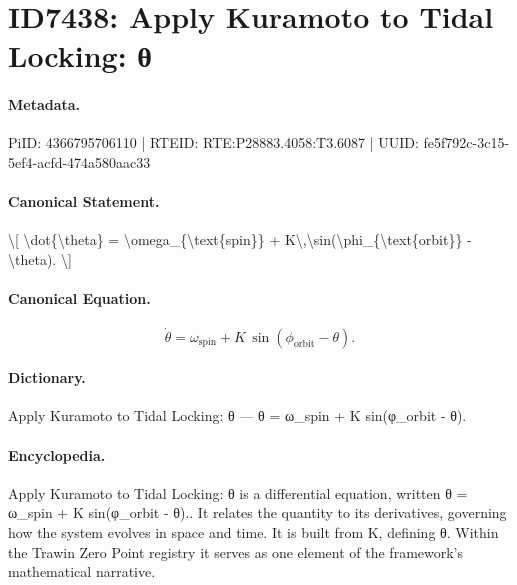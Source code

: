 \section*{ID7438: Apply Kuramoto to Tidal Locking: θ}
\paragraph{Metadata.}
PiID: 4366795706110 | RTEID: RTE:P28883.4058:T3.6087 | UUID: fe5f792c-3c15-5ef4-acfd-474a580aac33

\paragraph{Canonical Statement.}
\textbackslash{}[ \textbackslash{}dot\{\textbackslash{}theta\} = \textbackslash{}omega\_\{\textbackslash{}text\{spin\}\} + K\textbackslash{},\textbackslash{}sin(\textbackslash{}phi\_\{\textbackslash{}text\{orbit\}\} - \textbackslash{}theta). \textbackslash{}]

\paragraph{Canonical Equation.}
\[
\dot{\theta} = \omega_{\text{spin}} + K\,\sin(\phi_{\text{orbit}} - \theta).
\]

\paragraph{Dictionary.}
Apply Kuramoto to Tidal Locking: θ — θ = ω\_spin + K sin(φ\_orbit - θ).

\paragraph{Encyclopedia.}
Apply Kuramoto to Tidal Locking: θ is a differential equation, written θ = ω\_spin + K sin(φ\_orbit - θ).. It relates the quantity to its derivatives, governing how the system evolves in space and time. It is built from K, defining θ. Within the Trawin Zero Point registry it serves as one element of the framework's mathematical narrative.
